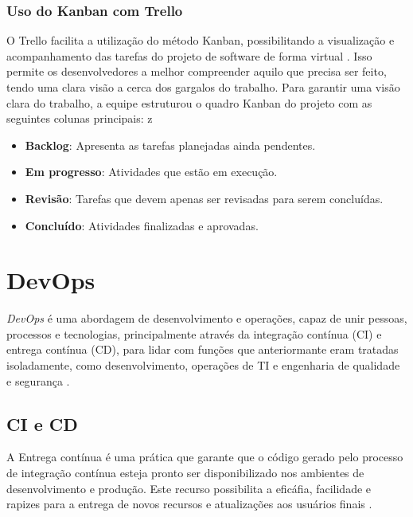 \subsubsection{Uso do Kanban com Trello}
O Trello facilita a utilização do método Kanban, possibilitando a visualização e acompanhamento das tarefas do projeto de software de forma virtual \cite{campos2023trello}. Isso permite os desenvolvedores a melhor compreender aquilo que precisa ser feito, tendo uma clara visão a cerca dos gargalos do trabalho. Para garantir uma visão clara do trabalho, a equipe estruturou o quadro Kanban do projeto com as seguintes colunas principais:
z
\begin{itemize}
    \item \textbf{Backlog}: Apresenta as tarefas planejadas ainda pendentes.
    \item \textbf{Em progresso}: Atividades que estão em execução.
    \item \textbf{Revisão}: Tarefas que devem apenas ser revisadas para serem concluídas.
    \item \textbf{Concluído}: Atividades finalizadas e aprovadas.
\end{itemize}


\section{DevOps}
\textit{DevOps} é uma abordagem de desenvolvimento e operações, capaz de unir pessoas, processos e tecnologias, principalmente através da integração contínua (CI) e entrega contínua (CD), para lidar com funções que anteriormante eram tratadas isoladamente, como desenvolvimento, operações de TI e engenharia de qualidade e segurança \cite{microsoftdevops}.

\subsection{CI e CD}
A Entrega contínua é uma prática que garante que o código gerado pelo processo de integração contínua esteja pronto ser disponibilizado nos ambientes de desenvolvimento e produção. Este recurso possibilita a eficáfia, facilidade e rapizes para a entrega de novos recursos e atualizações aos usuários finais \cite{gomes2023}.


